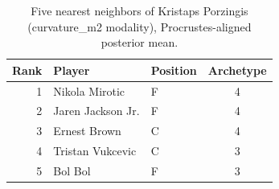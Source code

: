 \begin{table}[htbp]
  \centering\small
  \begin{tabular}{rllc}
    \toprule
    Rank & Player & Position & Archetype \\
    \midrule
    1 & Nikola Mirotic & F & 4 \\
    2 & Jaren Jackson Jr. & F & 4 \\
    3 & Ernest Brown & C & 4 \\
    4 & Tristan Vukcevic & C & 3 \\
    5 & Bol Bol & F & 3 \\
    \bottomrule
  \end{tabular}
  \caption{Five nearest neighbors of Kristaps Porzingis (curvature_m2 modality), Procrustes-aligned posterior mean.}
  \label{tab:Kristaps_Porzingis_neighbors_curvature_m2}
\end{table}

